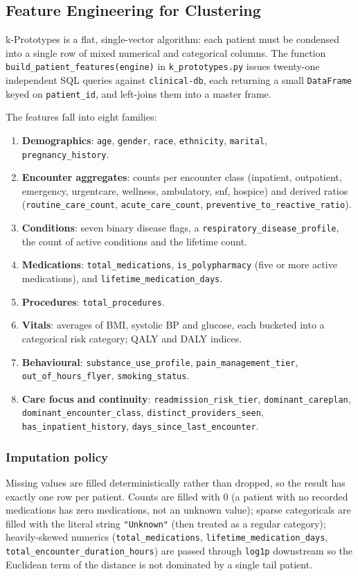 \subsection{Feature Engineering for Clustering}

k-Prototypes is a flat, single-vector algorithm: each patient must be condensed into a single row of mixed numerical and categorical columns. The function \texttt{build\_patient\_features(engine)} in \texttt{k\_prototypes.py} issues twenty-one independent SQL queries against \texttt{clinical-db}, each returning a small \texttt{DataFrame} keyed on \texttt{patient\_id}, and left-joins them into a master frame.

The features fall into eight families:
\begin{enumerate}
    \item \textbf{Demographics}: \texttt{age}, \texttt{gender}, \texttt{race}, \texttt{ethnicity}, \texttt{marital}, \texttt{pregnancy\_history}.
    \item \textbf{Encounter aggregates}: counts per encounter class (inpatient, outpatient, emergency, urgentcare, wellness, ambulatory, snf, hospice) and derived ratios (\texttt{routine\_care\_count}, \texttt{acute\_care\_count}, \texttt{preventive\_to\_reactive\_ratio}).
    \item \textbf{Conditions}: seven binary disease flags, a \texttt{respiratory\_disease\_profile}, the count of active conditions and the lifetime count.
    \item \textbf{Medications}: \texttt{total\_medications}, \texttt{is\_polypharmacy} (five or more active medications), and \texttt{lifetime\_medication\_days}.
    \item \textbf{Procedures}: \texttt{total\_procedures}.
    \item \textbf{Vitals}: averages of BMI, systolic BP and glucose, each bucketed into a categorical risk category; QALY and DALY indices.
    \item \textbf{Behavioural}: \texttt{substance\_use\_profile}, \texttt{pain\_management\_tier}, \texttt{out\_of\_hours\_flyer}, \texttt{smoking\_status}.
    \item \textbf{Care focus and continuity}: \texttt{readmission\_risk\_tier}, \texttt{dominant\_careplan}, \texttt{dominant\_encounter\_class}, \texttt{distinct\_providers\_seen}, \texttt{has\_inpatient\_history}, \texttt{days\_since\_last\_encounter}.
\end{enumerate}

\subsubsection*{Imputation policy}

Missing values are filled deterministically rather than dropped, so the result has exactly one row per patient. Counts are filled with $0$ (a patient with no recorded medications has zero medications, not an unknown value); sparse categoricals are filled with the literal string \texttt{"Unknown"} (then treated as a regular category); heavily-skewed numerics (\texttt{total\_medications}, \texttt{lifetime\_medication\_days}, \texttt{total\_encounter\_duration\_hours}) are passed through \texttt{log1p} downstream so the Euclidean term of the distance is not dominated by a single tail patient.

